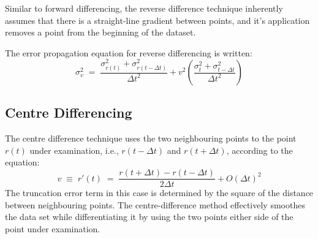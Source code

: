 \documentclass[namedreferences]{SolarPhysics}
\begin{document}
\begin{article}
Similar to forward differencing, the reverse difference technique inherently assumes that there is a straight-line gradient between points, and it's application removes a point from the beginning of the dataset. 

The error propagation equation for reverse differencing is written:
\begin{equation}
\sigma_v^2 \; = \; \frac{\sigma_{r(t)}^2+\sigma_{r(t-\Delta t)}^2}{\Delta t^2} + v^2 \left( \frac{\sigma_{t}^2+\sigma_{t-\Delta t}^2}{\Delta t^2} \right)
\end{equation}


\subsection{Centre Differencing}
\label{sect_centre}

The centre difference technique uses the two neighbouring points to the point $r(t)$ under examination, i.e., $r(t - \Delta t)$ and $r(t + \Delta t)$, according to the equation:
\begin{equation}
\label{eqn_centre}
v \; \equiv \; r'(t) \; = \; \frac{r(t + \Delta t) - r(t - \Delta t)}{2 \Delta t} + O(\Delta t)^{2}
\end{equation}
The truncation error term in this case is determined by the square of the distance between neighbouring points.%
The centre-difference method effectively smoothes the data set while differentiating it by using the two points either side of the point under examination. %
 

\end{article}
\end{document}
